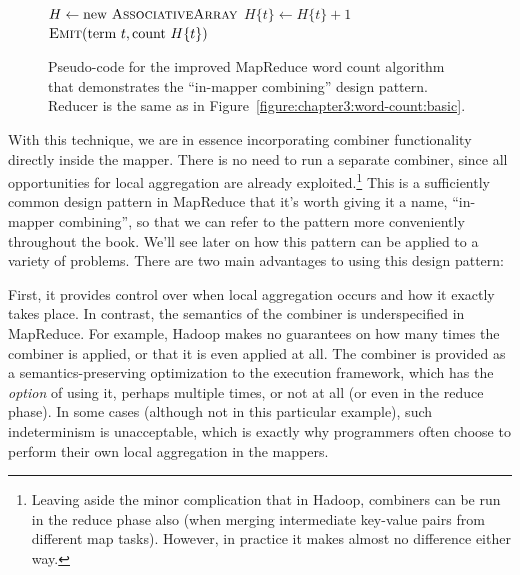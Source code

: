 \begin{figure}[t]
\algrenewcommand{}
\algrenewcommand{}
  \begin{algorithmic}[1]
    \State $H \gets \textrm{new }\textsc{AssociativeArray}$
    \EndProcedure
    \State $H\{t\} \gets H\{t\} + 1$
    \EndFor
    \EndProcedure
    \State $\textsc{Emit}(\textrm{term }t, \textrm{count }H\{t\} )$
    \EndFor
    \EndProcedure
    \EndFunction
  \end{algorithmic}
  \caption{Pseudo-code for the improved MapReduce word count algorithm
    that demonstrates the ``in-mapper combining'' design pattern.
    Reducer is the same as in
    Figure~\ref{figure:chapter3:word-count:basic}.}
\label{figure:chapter3:word-count:outer-hash}
\end{figure}

With this technique, we are in essence incorporating combiner
functionality directly inside the mapper.  There is no need to run a
separate combiner, since all opportunities for local aggregation are
already exploited.\footnote{Leaving aside the minor complication that
  in Hadoop, combiners can be run in the reduce phase also (when
  merging intermediate key-value pairs from different map tasks).
  However, in practice it makes almost no difference either way.} This
is a sufficiently common design pattern in MapReduce that it's worth
giving it a name, ``in-mapper combining'', so that we can refer to the
pattern more conveniently throughout the book.  We'll see later on how
this pattern can be applied to a variety of problems.  There are two
main advantages to using this design pattern:

First, it provides control over when local aggregation occurs and how
it exactly takes place.  In contrast, the semantics of the combiner is
underspecified in MapReduce.  For example, Hadoop makes no guarantees
on how many times the combiner is applied, or that it is even applied
at all.  The combiner is provided as a semantics-preserving
optimization to the execution framework, which has the {\it option} of
using it, perhaps multiple times, or not at all (or even in the reduce
phase).  In some cases (although not in this particular example), such
indeterminism is unacceptable, which is exactly why programmers often
choose to perform their own local aggregation in the mappers.

